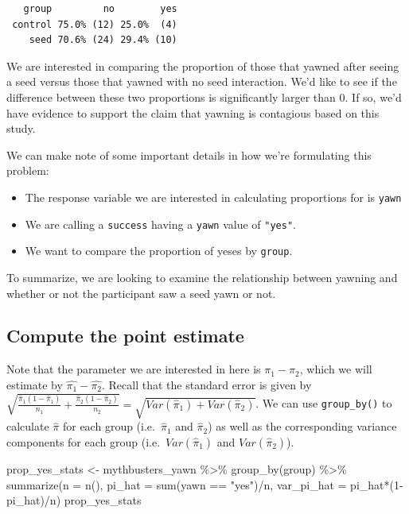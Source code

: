 \documentclass[
  letterpaper,
  DIV=11,
  numbers=noendperiod]{scrreprt}
\newenvironment{Shaded}{\begin{snugshade}}{\end{snugshade}}
\newcommand{\AttributeTok}[1]{\textcolor[rgb]{0.40,0.45,0.13}{#1}}
\newcommand{\DecValTok}[1]{\textcolor[rgb]{0.68,0.00,0.00}{#1}}
\newcommand{\FunctionTok}[1]{\textcolor[rgb]{0.28,0.35,0.67}{#1}}
\newcommand{\NormalTok}[1]{\textcolor[rgb]{0.00,0.23,0.31}{#1}}
\newcommand{\OtherTok}[1]{\textcolor[rgb]{0.00,0.23,0.31}{#1}}
\newcommand{\SpecialCharTok}[1]{\textcolor[rgb]{0.37,0.37,0.37}{#1}}
\newcommand{\StringTok}[1]{\textcolor[rgb]{0.13,0.47,0.30}{#1}}
\providecommand{\tightlist}{%
  \setlength{\itemsep}{0pt}\setlength{\parskip}{0pt}}\usepackage{longtable,booktabs,array}
\theoremstyle{definition}
\theoremstyle{remark}
\begin{document}
\begin{verbatim}
   group         no        yes
 control 75.0% (12) 25.0%  (4)
    seed 70.6% (24) 29.4% (10)
\end{verbatim}

We are interested in comparing the proportion of those that yawned after
seeing a seed versus those that yawned with no seed interaction. We'd
like to see if the difference between these two proportions is
significantly larger than 0. If so, we'd have evidence to support the
claim that yawning is contagious based on this study.

We can make note of some important details in how we're formulating this
problem:

\begin{itemize}
\tightlist
\item
  The response variable we are interested in calculating proportions for
  is \texttt{yawn}
\item
  We are calling a \texttt{success} having a \texttt{yawn} value of
  \texttt{"yes"}.
\item
  We want to compare the proportion of yeses by \texttt{group}.
\end{itemize}

To summarize, we are looking to examine the relationship between yawning
and whether or not the participant saw a seed yawn or not.

\hypertarget{compute-the-point-estimate}{%
\subsection{Compute the point
estimate}\label{compute-the-point-estimate}}

Note that the parameter we are interested in here is \(\pi_1 - \pi_2\),
which we will estimate by \(\hat{\pi_1} - \hat{\pi_2}\). Recall that the
standard error is given by
\(\sqrt{\frac{\hat{\pi}_1(1-\hat{\pi}_1)}{n_1} + \frac{\hat{\pi}_2(1 - \hat{\pi}_2)}{n_2}} = \sqrt{Var(\hat{\pi}_1) + Var(\hat{\pi}_2)}\).
We can use \texttt{group\_by()} to calculate \(\hat{\pi}\) for each
group (i.e.~\(\hat{\pi}_1\) and \(\hat{\pi}_2\)) as well as the
corresponding variance components for each group
(i.e.~\(Var(\hat{\pi}_1)\) and \(Var(\hat{\pi}_2)\)).

\begin{Shaded}
\begin{Highlighting}[]
\NormalTok{prop\_yes\_stats }\OtherTok{\textless{}{-}}\NormalTok{ mythbusters\_yawn }\SpecialCharTok{\%\textgreater{}\%} 
  \FunctionTok{group\_by}\NormalTok{(group) }\SpecialCharTok{\%\textgreater{}\%} 
  \FunctionTok{summarize}\NormalTok{(}\AttributeTok{n =} \FunctionTok{n}\NormalTok{(),}
            \AttributeTok{pi\_hat =} \FunctionTok{sum}\NormalTok{(yawn }\SpecialCharTok{==} \StringTok{"yes"}\NormalTok{)}\SpecialCharTok{/}\NormalTok{n,}
            \AttributeTok{var\_pi\_hat =}\NormalTok{ pi\_hat}\SpecialCharTok{*}\NormalTok{(}\DecValTok{1}\SpecialCharTok{{-}}\NormalTok{pi\_hat)}\SpecialCharTok{/}\NormalTok{n) }
\NormalTok{prop\_yes\_stats}
\end{Highlighting}
\end{Shaded}
\end{document}
